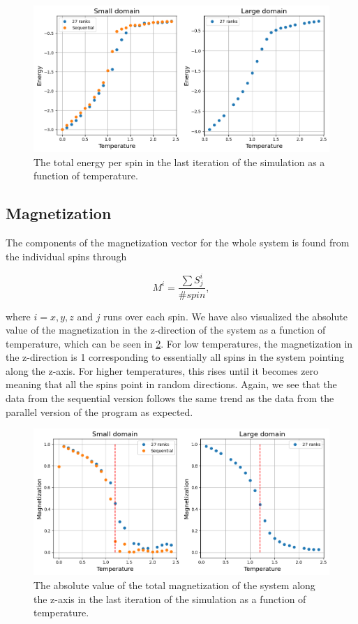 \documentclass{article}
\begin{document}
\begin{figure}[ht!]
    \centering
    \includegraphics[width=.87\textwidth]{Final_project/Report/energy.png}
    \caption{The total energy per spin in the last iteration of the simulation as a function of temperature.}
    \label{fig:energy}
\end{figure}
\FloatBarrier

\subsection{Magnetization}
The components of the magnetization vector for the whole system is found from the individual spins through

\begin{equation}
    M^{i} = \frac{\sum{S_j^{i}}}{\#spin},
\end{equation}

where $i=x,y,z$ and $j$ runs over each spin. We have also visualized the absolute value of the magnetization in the z-direction of the system as a function of temperature, which can be seen in \cref{fig:mag}. For low temperatures, the magnetization in the z-direction is 1 corresponding to essentially all spins in the system pointing along the z-axis. For higher temperatures, this rises until it becomes zero meaning that all the spins point in random directions. Again, we see that the data from the sequential version follows the same trend as the data from the parallel version of the program as expected.

\begin{figure}[ht!]
    \centering
    \includegraphics[width=.87\textwidth]{Final_project/Report/mag.png}
    \caption{The absolute value of the total magnetization of the system along the z-axis in the last iteration of the simulation as a function of temperature.}
    \label{fig:mag}
\end{figure}
\FloatBarrier
\end{document}
